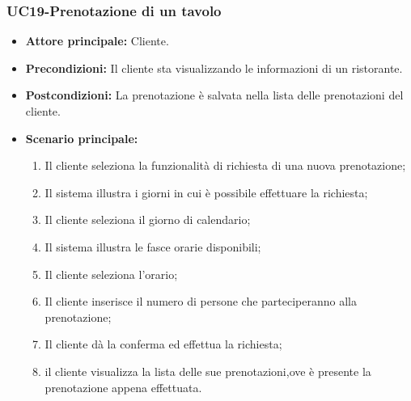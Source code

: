 \subsubsection{UC19-Prenotazione di un tavolo}
\begin{itemize}
    \item \textbf{Attore principale: }Cliente.
    \item \textbf{Precondizioni: }Il cliente sta visualizzando le informazioni di un ristorante.
    \item \textbf{Postcondizioni: }La prenotazione è salvata nella lista delle prenotazioni del cliente.
    \item \textbf{Scenario principale:} 
        \begin{enumerate}
            \item Il cliente seleziona la funzionalità di richiesta di una nuova prenotazione;
            \item Il sistema illustra i giorni in cui è possibile effettuare la richiesta;
            \item Il cliente seleziona il giorno di calendario;
            \item Il sistema illustra le fasce orarie disponibili;
            \item Il cliente seleziona l'orario;
            \item Il cliente inserisce il numero di persone che parteciperanno alla prenotazione;
            \item Il cliente dà la conferma ed effettua la richiesta;
            \item il cliente visualizza la lista delle sue prenotazioni,ove è presente la prenotazione appena
            effettuata.
        \end{enumerate}
\end{itemize}

